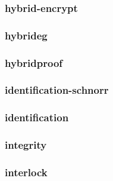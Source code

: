 \begin{frame} \frametitle{hybrid-encrypt}
\begin{figure}
\begin{center}

\end{center}
\end{figure}
\end{frame}
\begin{frame} \frametitle{hybrideg}
\begin{figure}
\begin{center}

\end{center}
\end{figure}
\end{frame}
\begin{frame} \frametitle{hybridproof}
\begin{figure}
\begin{center}

\end{center}
\end{figure}
\end{frame}
\begin{frame} \frametitle{identification-schnorr}
\begin{figure}
\begin{center}

\end{center}
\end{figure}
\end{frame}
\begin{frame} \frametitle{identification}
\begin{figure}
\begin{center}

\end{center}
\end{figure}
\end{frame}
\begin{frame} \frametitle{integrity}
\begin{figure}
\begin{center}

\end{center}
\end{figure}
\end{frame}
\begin{frame} \frametitle{interlock}
\begin{figure}
\begin{center}

\end{center}
\end{figure}
\end{frame}
